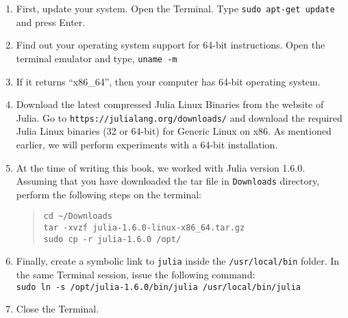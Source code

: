\begin{enumerate}
      \item First, update your system. Open the Terminal. Type 
            {\tt sudo apt-get update} and press Enter. 
      \item Find out your operating system support for 64-bit
            instructions. Open the terminal emulator and type, {\tt uname -m}
      \item If it returns ``x86\_64'', then your computer has 64-bit
            operating system. 
      \item Download the latest compressed Julia Linux Binaries from the website of Julia. 
            Go to {\tt https://julialang.org/downloads/} and download the 
            required Julia Linux binaries (32 or 64-bit) for Generic Linux on x86.  
            As mentioned earlier, we will perform experiments with a 64-bit installation.
      \item At the time of writing this book, we worked with Julia version 1.6.0.
            Assuming that you have downloaded the tar file in {\tt Downloads} directory, perform the following
            steps on the terminal:
            \begin{quote}
                  {\tt cd {\large\textasciitilde}/Downloads\\
                        tar -xvzf julia-1.6.0-linux-x86\_64.tar.gz\\
                        sudo cp -r julia-1.6.0 /opt/}
            \end{quote}
      \item Finally, create a symbolic link to {\tt julia} inside the 
            {\tt /usr/local/bin} folder. In the same Terminal session, issue the 
            following command: \\
            {\tt sudo ln -s /opt/julia-1.6.0/bin/julia /usr/local/bin/julia} 
      \item Close the Terminal.            
\end{enumerate}

